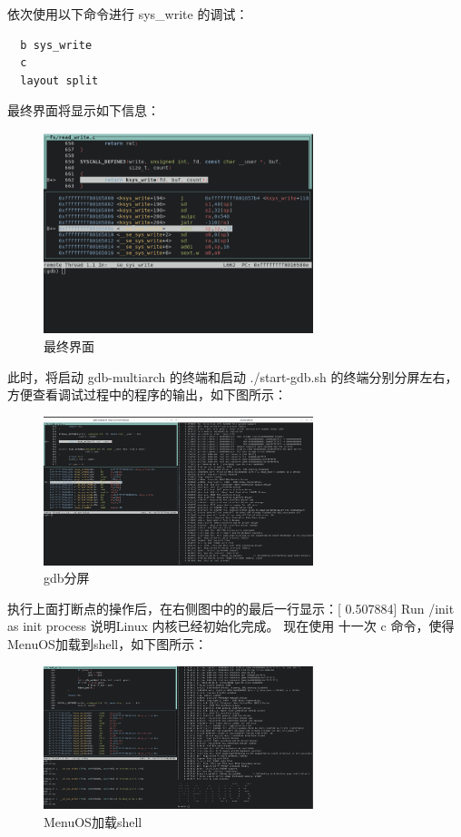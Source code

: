 \documentclass[lang=cn,10pt]{elegantbook}
\begin{document}
依次使用以下命令进行 sys\_write 的调试：
\begin{lstlisting}
  b sys_write
  c
  layout split
\end{lstlisting}
最终界面将显示如下信息：
\begin{figure}[htbp]
  \centering
  \includegraphics[width=0.7\textwidth]{image/image-20231105221933745.png}
  \caption{最终界面}
\end{figure}


此时，将启动 gdb-multiarch 的终端和启动 ./start-gdb.sh 的终端分别分屏左右，方便查看调试过程中的程序的输出，如下图所示：
\begin{figure}[htbp]
  \centering
  \includegraphics[width=0.7\textwidth]{image/image-20231106161606896.png}
  \caption{gdb分屏}
\end{figure}

\newpage
执行上面打断点的操作后，在右侧图中的的最后一行显示：[    0.507884] Run /init as init process 说明Linux 内核已经初始化完成。 现在使用 十一次 c 命令，使得MenuOS加载到shell，如下图所示：
\begin{figure}[htbp]
  \centering
  \includegraphics[width=0.7\textwidth]{image/image-20231106162535743.png}
  \caption{MenuOS加载shell}
\end{figure}
\end{document}
